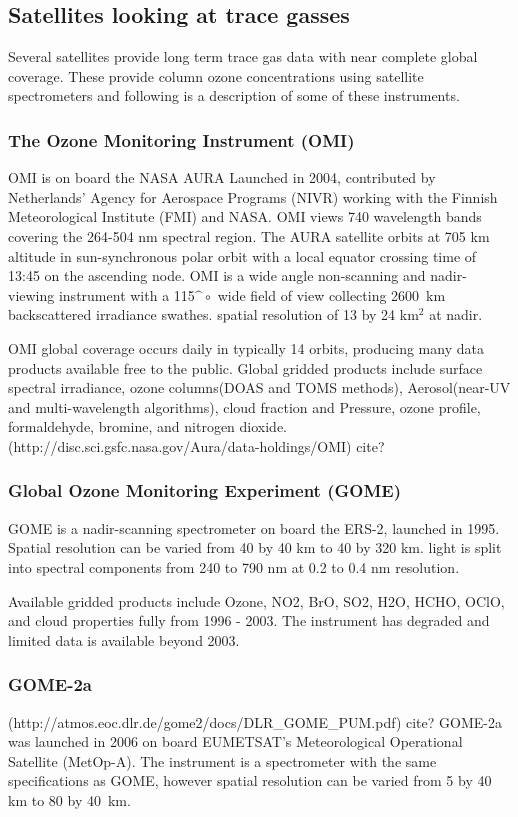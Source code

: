 \subsection{Satellites looking at trace gasses}
Several satellites provide long term trace gas data with near complete global coverage. These provide column ozone concentrations using satellite spectrometers and following is a description of some of these instruments.

\subsubsection{The Ozone Monitoring Instrument (OMI)}
OMI is on board the NASA AURA Launched in 2004, contributed by Netherlands' Agency for Aerospace Programs (NIVR) working with the Finnish Meteorological Institute (FMI) and NASA. OMI views 740 wavelength bands covering the 264-504 nm spectral region.
The AURA satellite orbits at 705 km altitude in sun-synchronous polar orbit with a local equator crossing time of 13:45 on the ascending node.
OMI is a wide angle non-scanning and nadir-viewing instrument with a 115$\^{\circ}$ wide field of view collecting 2600~km backscattered irradiance swathes. spatial resolution of 13 by 24 km$^2$ at nadir. 

OMI global coverage occurs daily in typically 14 orbits, producing many data products available free to the public.
Global gridded products include surface spectral irradiance, ozone columns(DOAS and TOMS methods), Aerosol(near-UV and multi-wavelength algorithms), cloud fraction and Pressure, ozone profile, formaldehyde, bromine, and nitrogen dioxide.
(http://disc.sci.gsfc.nasa.gov/Aura/data-holdings/OMI) cite?

\subsubsection{Global Ozone Monitoring Experiment (GOME)}

GOME is a nadir-scanning spectrometer on board the ERS-2, launched in 1995.
Spatial resolution can be varied from 40 by 40 km to 40 by 320 km.
light is split into spectral components from 240 to 790 nm at 0.2 to 0.4 nm resolution.

Available gridded products include Ozone, NO2, BrO, SO2, H2O, HCHO, OClO, and cloud properties fully from 1996 - 2003. The instrument has degraded and limited data is available beyond 2003. 

\subsubsection{GOME-2a}
(http://atmos.eoc.dlr.de/gome2/docs/DLR_GOME_PUM.pdf) cite?
GOME-2a was launched in 2006 on board EUMETSAT's Meteorological Operational Satellite (MetOp-A). 
The instrument is a spectrometer with the same specifications as GOME, however spatial resolution can be varied from 5 by 40 km to 80 by 40~km.


